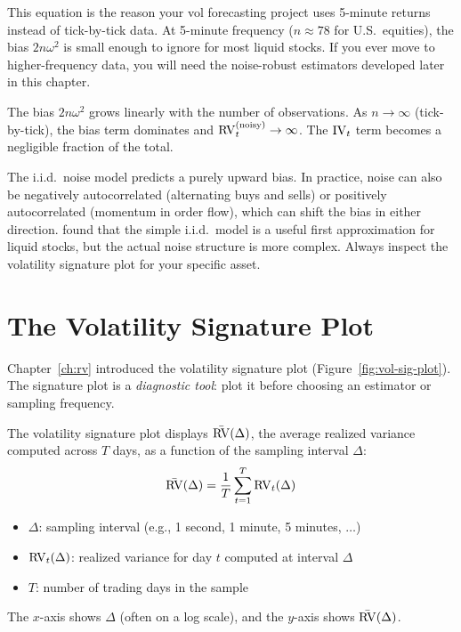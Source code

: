 \begin{projectconnection}
This equation is the reason your vol forecasting project uses 5-minute returns instead of tick-by-tick data.
At 5-minute frequency ($n \approx 78$ for U.S.\ equities), the bias $2n\omega^2$ is small enough to ignore for most liquid stocks.
If you ever move to higher-frequency data, you will need the noise-robust estimators developed later in this chapter.
\end{projectconnection}

The bias $2n\omega^2$ grows linearly with the number of observations.
As $n \to \infty$ (tick-by-tick), the bias term dominates and $\operatorname{RV}_t^{(\text{noisy})} \to \infty$.
The $\operatorname{IV}_t$ term becomes a negligible fraction of the total.

\begin{warning}
The i.i.d.\ noise model predicts a purely upward bias.
In practice, noise can also be negatively autocorrelated (alternating buys and sells) or positively autocorrelated (momentum in order flow), which can shift the bias in either direction.
\citet{HansenLunde2006} found that the simple i.i.d.\ model is a useful first approximation for liquid stocks, but the actual noise structure is more complex.
Always inspect the volatility signature plot for your specific asset.
\end{warning}


\section{The Volatility Signature Plot}
\label{sec:vol-sig-plot}

Chapter~\ref{ch:rv} introduced the volatility signature plot (Figure~\ref{fig:vol-sig-plot}).
The signature plot is a \emph{diagnostic tool}: plot it before choosing an estimator or sampling frequency.

\begin{definition}
The volatility signature plot displays $\bar{\operatorname{RV}}(\Delta)$, the average realized variance computed across $T$ days, as a function of the sampling interval $\Delta$:
\[
  \bar{\operatorname{RV}}(\Delta) = \frac{1}{T} \sum_{t=1}^{T} \operatorname{RV}_t(\Delta)
\]
\begin{itemize}[nosep]
  \item $\Delta$: sampling interval (e.g., 1 second, 1 minute, 5 minutes, $\ldots$)
  \item $\operatorname{RV}_t(\Delta)$: realized variance for day $t$ computed at interval $\Delta$
  \item $T$: number of trading days in the sample
\end{itemize}
The $x$-axis shows $\Delta$ (often on a log scale), and the $y$-axis shows $\bar{\operatorname{RV}}(\Delta)$.
\end{definition}

